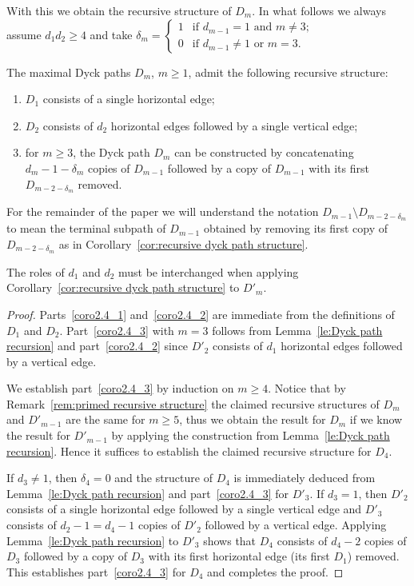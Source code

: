 \documentclass[ALCO,ThmDefs,Unicode,epreuves]{cedram}
\begin{document}
With this we obtain the recursive structure of $D_m$. In what follows we always assume $d_1d_2\ge4$ and take $\delta_m=\begin{cases} 1 & \text{if $d_{m-1}=1$ and $m\ne3$;}\\ 0 & \text{if $d_{m-1}\ne1$ or $m=3$.}\end{cases}$
\begin{corollary}
 \label{cor:recursive dyck path structure}
 The maximal Dyck paths $D_m$, $m\ge1$, admit the following recursive structure:
 \begin{enumerate}[label=(\alph*)]
 \item\label{coro2.4_1} $D_1$ consists of a single horizontal edge;
 \item\label{coro2.4_2} $D_2$ consists of $d_2$ horizontal edges followed by a single vertical edge;
 \item\label{coro2.4_3} for $m\ge3$, the Dyck path $D_m$ can be constructed by concatenating $d_m-1-\delta_m$ copies of $D_{m-1}$ followed by a copy of $D_{m-1}$ with its first $D_{m-2-\delta_m}$ removed.
 \end{enumerate}
\end{corollary}
For the remainder of the paper we will understand the notation $D_{m-1}\setminus D_{m-2-\delta_m}$ to mean the terminal subpath of $D_{m-1}$ obtained by removing its first copy of $D_{m-2-\delta_m}$ as in Corollary~\ref{cor:recursive dyck path structure}.
\begin{remark}
 \label{rem:primed recursive structure}
 The roles of $d_1$ and $d_2$ must be interchanged when applying Corollary~\ref{cor:recursive dyck path structure} to $D'_m$.
\end{remark}
\begin{proof}
 Parts~\ref{coro2.4_1} and~\ref{coro2.4_2} are immediate from the definitions of $D_1$ and $D_2$. 
 Part~\ref{coro2.4_3} with $m=3$ follows from Lemma~\ref{le:Dyck path recursion} and part~\ref{coro2.4_2} since $D'_2$ consists of $d_1$ horizontal edges followed by a vertical edge. 

 We establish part~\ref{coro2.4_3} by induction on $m\ge4$. 
 Notice that by Remark~\ref{rem:primed recursive structure} the claimed recursive structures of $D_m$ and $D'_{m-1}$ are the same for $m\ge5$, thus we obtain the result for $D_m$ if we know the result for $D'_{m-1}$ by applying the construction from Lemma~\ref{le:Dyck path recursion}. 
 Hence it suffices to establish the claimed recursive structure for $D_4$. 

 If $d_3\ne1$, then $\delta_4=0$ and the structure of $D_4$ is immediately deduced from Lemma~\ref{le:Dyck path recursion} and part~\ref{coro2.4_3} for $D'_3$. 
 If $d_3=1$, then $D'_2$ consists of a single horizontal edge followed by a single vertical edge and $D'_3$ consists of $d_2-1=d_4-1$ copies of $D'_2$ followed by a vertical edge. 
 Applying Lemma~\ref{le:Dyck path recursion} to $D'_3$ shows that $D_4$ consists of $d_4-2$ copies of $D_3$ followed by a copy of $D_3$ with its first horizontal edge (\ie its first $D_1$) removed. 
 This establishes part~\ref{coro2.4_3} for $D_4$ and completes the proof.
\end{proof}
\end{document}
